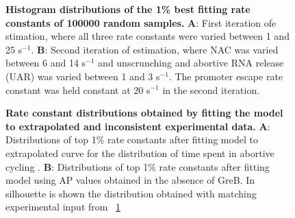 \begin{figure}[h]
  \caption{ {\bf Histogram distributions of the 1\% best fitting rate
    constants of 100000 random samples.} \textbf{A}: First iteration ofe
    stimation, where all three rate constants were varied between 1 and 25
    s$^{-1}$. \textbf{B}: Second iteration of estimation, where NAC was varied
    between 6 and 14 s$^{-1}$ and unscrunching and abortive RNA release (UAR)
    was varied between 1 and 3 s$^{-1}$. The promoter escape rate constant was
    held constant at 20 s$^{-1}$ in the second iteration.}
    \label{fig:parameter_estimation_proper}
\end{figure}

\begin{figure}[h]
    \caption{
      {\bf Rate constant distributions obtained by fitting the model to
      extrapolated and inconsistent experimental data.} \textbf{A}:
      Distributions of top 1\% rate constants after fitting model to
      extrapolated curve for the distribution of time spent in abortive
      cycling \cite{revyakin_abortive_2006}. \textbf{B}: Distributions of top
      1\% rate constants after fitting model using AP values obtained in the
      absence of GreB. In silhouette is shown the distribution obtained with
      matching experimental input from \FIG~\ref{fig:parameter_estimation_proper}}
      \label{fig:extrap_and_GreB_minus_fit}
\end{figure}

